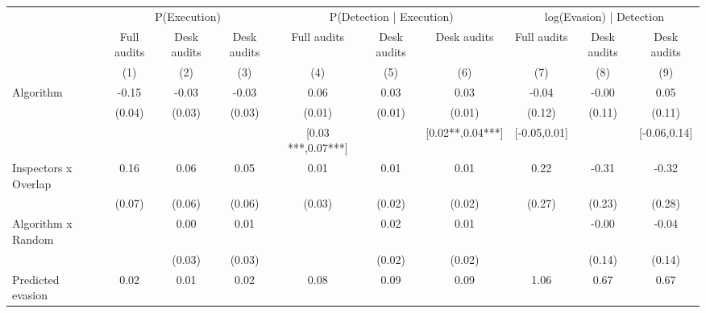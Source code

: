 \begin{tabular}{lccc|ccc|ccc} \toprule
\multicolumn{1}{l}{} & \multicolumn{3}{c}{P(Execution)} & \multicolumn{3}{c}{P(Detection | Execution)} & \multicolumn{3}{c}{log(Evasion) | Detection} \\\cmidrule(lr){2-4}\cmidrule(lr){5-7}\cmidrule(lr){8-10} \multicolumn{1}{l}{} & Full audits & Desk audits & Desk audits & Full audits & Desk audits & Desk audits & Full audits & Desk audits & Desk audits \\ \multicolumn{1}{l}{} & (1) & (2) & (3) & (4) & (5) & (6) & (7) & (8) & (9) \\ \midrule
Algorithm   &       -0.15\sym{***}&       -0.03         &       -0.03         &        0.06\sym{***}&        0.03\sym{***}&        0.03\sym{***}&       -0.04         &       -0.00         &        0.05         \\
            &      (0.04)         &      (0.03)         &      (0.03)         &      (0.01)         &      (0.01)         &      (0.01)         &      (0.12)         &      (0.11)         &      (0.11)         \\
\addlinespace
 & & & & [0.03 ***,0.07***] & & [0.02**,0.04***] & [-0.05,0.01] & & [-0.06,0.14] \\  Inspectors x Overlap&        0.16\sym{**} &        0.06         &        0.05         &        0.01         &        0.01         &        0.01         &        0.22         &       -0.31         &       -0.32         \\
            &      (0.07)         &      (0.06)         &      (0.06)         &      (0.03)         &      (0.02)         &      (0.02)         &      (0.27)         &      (0.23)         &      (0.28)         \\
\addlinespace
Algorithm x Random&                     &        0.00         &        0.01         &                     &        0.02         &        0.01         &                     &       -0.00         &       -0.04         \\
            &                     &      (0.03)         &      (0.03)         &                     &      (0.02)         &      (0.02)         &                     &      (0.14)         &      (0.14)         \\
\addlinespace
Predicted evasion&        0.02\sym{***}&        0.01\sym{***}&        0.02\sym{***}&        0.08\sym{***}&        0.09\sym{***}&        0.09\sym{***}&        1.06\sym{***}&        0.67\sym{***}&        0.67\sym{***}\\

\end{tabular}
